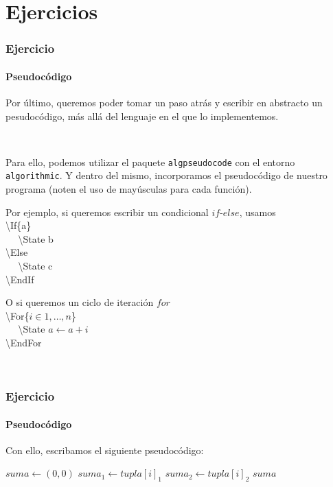 \section{Ejercicios}\label{ejercicios}

\begin{frame}
\frametitle{Ejercicio}
\framesubtitle{Pseudocódigo}

Por último, queremos poder tomar un paso atrás y escribir en abstracto un pesudocódigo, más allá del lenguaje en el que lo implementemos.

\

Para ello, podemos utilizar el \textcolor{codeorange}{paquete} \texttt{algpseudocode} con el \textcolor{codeorange}{entorno} \texttt{algorithmic}. Y dentro del mismo, incorporamos el pseudocódigo de nuestro programa (noten el uso de mayúsculas para cada función).

\begin{multicols}{2}

Por ejemplo, si queremos escribir un condicional $if$-$else$, usamos \\

\textbackslash If\{a\} \\
$~~~~~~$\textbackslash State b \\
\textbackslash Else \\
$~~~~~~$\textbackslash State c \\
\textbackslash EndIf \\

\pause

O si queremos un ciclo de iteración $for$ \\

\textbackslash For\{$i \in 1,\ldots,n$\} \\
$~~~~~~$\textbackslash State $a \gets a + i$ \\
\textbackslash EndFor

\

\end{multicols}
\end{frame}

\begin{frame}
\frametitle{Ejercicio}
\framesubtitle{Pseudocódigo}

Con ello, escribamos el siguiente pseudocódigo:

\begin{tcolorbox}[colframe=color1]
\begin{center}
\begin{algorithmic}
        \State $suma \gets (0,0)$
            \State $suma_1 \gets tupla[i]_1$
            \State $suma_2 \gets tupla[i]_2$
        \EndFor
        \EndIf
        \State \Return $suma$
    \EndFunction
\end{algorithmic}
\end{center}
\end{tcolorbox}

\end{frame}